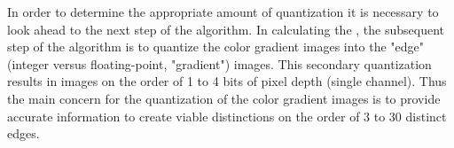 In order to determine the appropriate amount of quantization it is necessary to look ahead to the next step of the algorithm. In calculating the , the subsequent step of the algorithm is to quantize the color gradient images into the "edge" (integer versus floating-point, "gradient") images. This secondary quantization results in images on the order of 1 to 4 bits of pixel depth (single channel). Thus the main concern for the quantization of the color gradient images is to provide accurate information to create viable distinctions on the order of 3 to 30 distinct edges.



